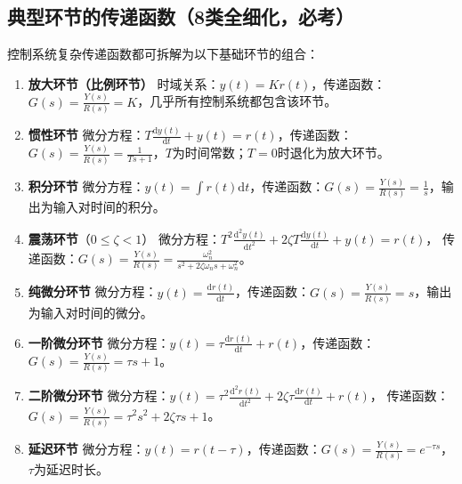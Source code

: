 \subsection{典型环节的传递函数（8类全细化，必考）}
控制系统复杂传递函数都可拆解为以下基础环节的组合：
\begin{enumerate}
    \item \textbf{放大环节（比例环节）}
    时域关系：$y(t)=Kr(t)$，传递函数：$\displaystyle G(s)=\frac{Y(s)}{R(s)}=K$，几乎所有控制系统都包含该环节。

    \item \textbf{惯性环节}
    微分方程：$\displaystyle T\frac{\mathrm{d}y(t)}{\mathrm{d}t}+y(t)=r(t)$，传递函数：$\displaystyle G(s)=\frac{Y(s)}{R(s)}=\frac1{Ts+1}$，$T$为时间常数；$T=0$时退化为放大环节。

    \item \textbf{积分环节}
    微分方程：$\displaystyle y(t)=\int r(t)\mathrm{d}t$，传递函数：$\displaystyle G(s)=\frac{Y(s)}{R(s)}=\frac1s$，输出为输入对时间的积分。

    \item \textbf{震荡环节}（$0\le\zeta<1$）
    微分方程：$\displaystyle T^2\frac{\mathrm{d}^2y(t)}{\mathrm{d}t^2}+2\zeta T\frac{\mathrm{d}y(t)}{\mathrm{d}t}+y(t)=r(t)$，
    传递函数：$\displaystyle G(s)=\frac{Y(s)}{R(s)}=\frac{\omega_n^2}{s^2+2\zeta\omega_n s+\omega_n^2}$。

    \item \textbf{纯微分环节}
    微分方程：$\displaystyle y(t)=\frac{\mathrm{d}r(t)}{\mathrm{d}t}$，传递函数：$\displaystyle G(s)=\frac{Y(s)}{R(s)}=s$，输出为输入对时间的微分。

    \item \textbf{一阶微分环节}
    微分方程：$\displaystyle y(t)=\tau\frac{\mathrm{d}r(t)}{\mathrm{d}t}+r(t)$，传递函数：$\displaystyle G(s)=\frac{Y(s)}{R(s)}=\tau s+1$。

    \item \textbf{二阶微分环节}
    微分方程：$\displaystyle y(t)=\tau^2\frac{\mathrm{d}^2r(t)}{\mathrm{d}t^2}+2\zeta\tau\frac{\mathrm{d}r(t)}{\mathrm{d}t}+r(t)$，
    传递函数：$\displaystyle G(s)=\frac{Y(s)}{R(s)}=\tau^2 s^2+2\zeta\tau s+1$。

    \item \textbf{延迟环节}
    微分方程：$y(t)=r(t-\tau)$，传递函数：$\displaystyle G(s)=\frac{Y(s)}{R(s)}=e^{-\tau s}$，$\tau$为延迟时长。
\end{enumerate}

\bigskip

